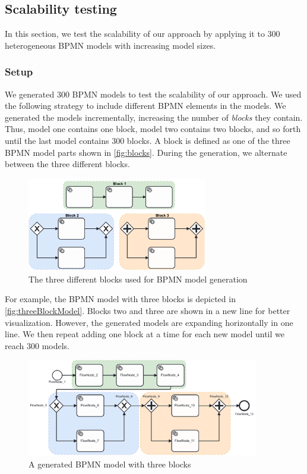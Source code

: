 \documentclass{lmcs} %
\begin{document}
\subsection{Scalability testing} \label{subsec:scalability}

In this section, we test the scalability of our approach by applying it to 300 heterogeneous BPMN models with increasing model sizes.

\subsubsection{Setup}

We generated 300 BPMN models to test the scalability of our approach.
We used the following strategy to include different BPMN elements in the models.
We generated the models incrementally, increasing the number of \textit{blocks} they contain.
Thus, model one contains one block, model two contains two blocks, and so forth until the last model contains 300 blocks.
A block is defined as one of the three BPMN model parts shown in \autoref{fig:blocks}.
During the generation, we alternate between the three different blocks.

\begin{figure}[ht]
    \centering
    \includegraphics[width=0.7\textwidth]{images/blocks.pdf}
    \caption{The three different blocks used for BPMN model generation}
    \label{fig:blocks}
\end{figure}

For example, the BPMN model with three blocks is depicted in \autoref{fig:threeBlockModel}.
Blocks two and three are shown in a new line for better visualization.
However, the generated models are expanding horizontally in one line.
We then repeat adding one block at a time for each new model until we reach 300 models.

\begin{figure}[ht]
    \centering
    \includegraphics[width=0.9\textwidth]{images/003.pdf}
    \caption{A generated BPMN model with three blocks}
    \label{fig:threeBlockModel}
\end{figure}
\end{document}
